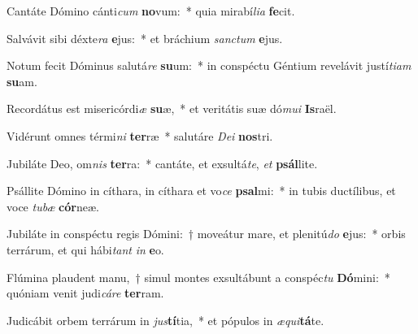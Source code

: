 \item Cantáte Dómino cánti\textit{cum} \textbf{no}vum:~* quia mirabí\textit{li}\textit{a} \textbf{fe}cit.
\item Salvávit sibi déxte\textit{ra} \textbf{e}jus:~* et bráchium \textit{sanc}\textit{tum} \textbf{e}jus.
\item Notum fecit Dóminus salutá\textit{re} \textbf{su}um:~* in conspéctu Géntium revelávit justí\textit{ti}\textit{am} \textbf{su}am.
\item Recordátus est misericórdi\textit{æ} \textbf{su}æ,~* et veritátis suæ dó\textit{mu}\textit{i} \textbf{Is}raël.
\item Vidérunt omnes térmi\textit{ni} \textbf{ter}ræ~* salutáre \textit{De}\textit{i} \textbf{nos}tri.
\item Jubiláte Deo, om\textit{nis} \textbf{ter}ra:~* cantáte, et exsultá\textit{te}, \textit{et} \textbf{psál}lite.
\item Psállite Dómino in cíthara, in cíthara et vo\textit{ce} \textbf{psal}mi:~* in tubis ductílibus, et voce \textit{tu}\textit{bæ} \textbf{cór}neæ.
\item Jubiláte in conspéctu regis Dómini:~† moveátur mare, et plenitú\textit{do} \textbf{e}jus:~* orbis terrárum, et qui hábi\textit{tant} \textit{in} \textbf{e}o.
\item Flúmina plaudent manu,~† simul montes exsultábunt a conspéc\textit{tu} \textbf{Dó}mini:~* quóniam venit judi\textit{cá}\textit{re} \textbf{ter}ram.
\item Judicábit orbem terrárum in \textit{jus}\textbf{tí}tia,~* et pópulos in \textit{æ}\textit{qui}\textbf{tá}te.
